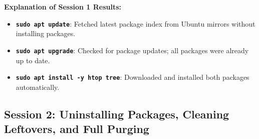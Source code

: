 \documentclass[10pt,a4paper]{article}
\newcommand{\cmd}[1]{\texttt{\textbf{#1}}}
\begin{document}
\vspace{2pt}\noindent\textbf{Explanation of Session 1 Results:}\par\vspace{1pt}
\begin{itemize}[noitemsep,topsep=1pt,leftmargin=1.2em]
  \item \cmd{sudo apt update}: Fetched latest package index from Ubuntu mirrors without installing packages.
  \item \cmd{sudo apt upgrade}: Checked for package updates; all packages were already up to date.
  \item \cmd{sudo apt install -y htop tree}: Downloaded and installed both packages automatically.
\end{itemize}

\subsection{Session 2: Uninstalling Packages, Cleaning Leftovers, and Full Purging}
\end{document}
